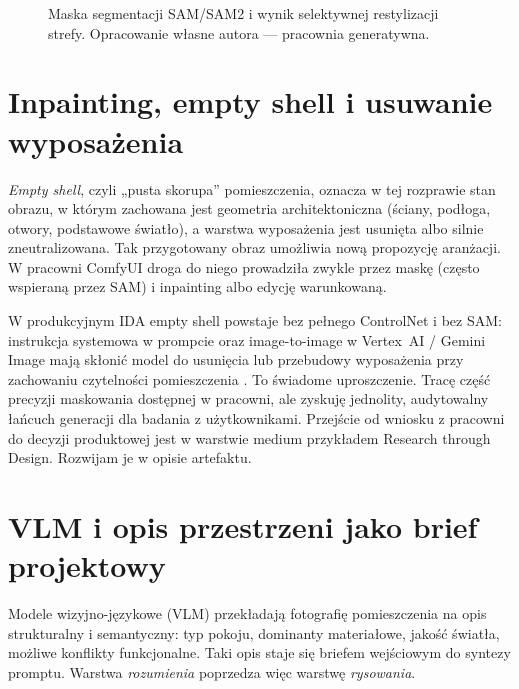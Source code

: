 \begin{figure}[htbp]
  \centering
  \caption{Maska segmentacji SAM/SAM2 i wynik selektywnej restylizacji strefy.
  Opracowanie własne autora --- pracownia generatywna.}
  \label{fig:ch04:sam}
\end{figure}

\section{Inpainting, empty shell i usuwanie wyposażenia}
\label{ch04:sec:inpaint}

\emph{Empty shell}, czyli „pusta skorupa” pomieszczenia, oznacza w tej rozprawie stan obrazu, w którym zachowana jest geometria architektoniczna (ściany, podłoga, otwory, podstawowe światło), a warstwa wyposażenia jest usunięta albo silnie zneutralizowana.
Tak przygotowany obraz umożliwia nową propozycję aranżacji. W pracowni ComfyUI droga do niego prowadziła zwykle przez maskę (często wspieraną przez SAM) i inpainting albo edycję warunkowaną.

W produkcyjnym IDA empty shell powstaje bez pełnego ControlNet i bez SAM: instrukcja systemowa w prompcie oraz image-to-image w Vertex~AI / Gemini Image mają skłonić model do usunięcia lub przebudowy wyposażenia przy zachowaniu czytelności pomieszczenia \parencite{idaPlatform2026}.
To świadome uproszczenie. Tracę część precyzji maskowania dostępnej w pracowni, ale zyskuję jednolity, audytowalny łańcuch generacji dla badania z użytkownikami.
Przejście od wniosku z pracowni do decyzji produktowej jest w warstwie medium przykładem Research through Design. Rozwijam je w opisie artefaktu.

\section{VLM i opis przestrzeni jako brief projektowy}
\label{ch04:sec:vlm}

Modele wizyjno-językowe (VLM) przekładają fotografię pomieszczenia na opis strukturalny i semantyczny: typ pokoju, dominanty materiałowe, jakość światła, możliwe konflikty funkcjonalne.
Taki opis staje się briefem wejściowym do syntezy promptu. Warstwa \emph{rozumienia} poprzedza więc warstwę \emph{rysowania}.

